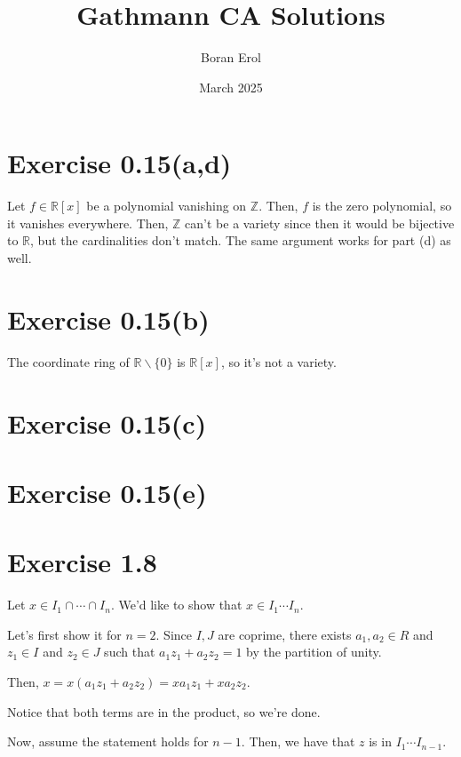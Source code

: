 \documentclass{article}
\title{Gathmann CA Solutions}
\date{March 2025}
\author{Boran Erol}
\theoremstyle{definition}
\begin{document}
\maketitle

\section{Exercise 0.15(a,d)}

Let $ f \in \mathbb{R}[x] $ be a polynomial vanishing on $ \mathbb{Z} $.
Then, $ f $ is the zero polynomial, so it vanishes everywhere. Then, $ \mathbb{Z} $
can't be a variety since then it would be bijective to $ \mathbb{R} $,
but the cardinalities don't match. The same argument works for part (d)
as well.

\section{Exercise 0.15(b)}

The coordinate ring of $ \mathbb{R} \backslash \{ 0 \} $ is $ \mathbb{R}[x] $,
so it's not a variety.

\section{Exercise 0.15(c)}


\section{Exercise 0.15(e)}


\section{Exercise 1.8}

Let $ x \in I_{1} \cap \cdots \cap I_{n} $.
We'd like to show that $ x \in I_{1} \cdots I_{n} $.

Let's first show it for $ n = 2 $. Since $ I,J $ are coprime,
there exists $ a_{1}, a_{2} \in R $ and $ z_{1} \in I $ and $ z_{2} \in J $
such that $ a_{1}z_{1} + a_{2}z_{2} = 1 $ by the partition of unity.

Then, $ x = x(a_{1}z_{1} + a_{2}z_{2}) = x a_{1} z_{1} + x a_{2} z_{2} $.

Notice that both terms are in the product, so we're done.

Now, assume the statement holds for $ n - 1 $. Then, we have that $ z $
is in $ I_{1} \cdots I_{n - 1} $.
\end{document}
